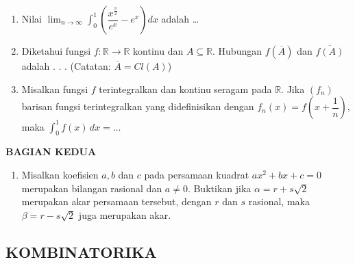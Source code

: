 \documentclass[12pt,twoside]{article}
\begin{document}
\begin{enumerate}
	\item Nilai $\displaystyle\lim_{n \to \infty}  \displaystyle\int_{0}^{1} \left(\dfrac{x^{\frac{\pi}{2}}}{e^x} - e^x\right) dx$ adalah \dots

	\item Diketahui fungsi $f : \mathbb{R} \to \mathbb{R}$ kontinu dan $A \subseteq \mathbb{R} $. Hubungan $f(\overline{A})$ dan $\overline{f(A)}$ adalah . . . (Catatan: $\overline{A} = Cl (A)$)

	\item Misalkan fungsi $f$ terintegralkan dan kontinu seragam pada $\mathbb{R}$. Jika $(f_n)$ barisan fungsi terintegralkan yang didefinisikan dengan $f_n(x) = f\left(x + \dfrac{1}{n}\right)$, maka $\displaystyle \int_{0}^{1} f(x) \, dx = \dots$
\end{enumerate}

\newpage \textbf{BAGIAN KEDUA}
\begin{enumerate}
	\item Misalkan koefisien $a,b$ dan $c$ pada persamaan kuadrat $ax^2 + bx + c = 0$ merupakan bilangan rasional dan $a \neq 0$. Buktikan jika $\alpha = r + s \sqrt{2} $ merupakan akar persamaan tersebut, dengan $r$ dan $s$ rasional, maka $\beta = r-s\sqrt{2}$ juga merupakan akar.
\end{enumerate}

\newpage \subsection{KOMBINATORIKA}
\end{document}
